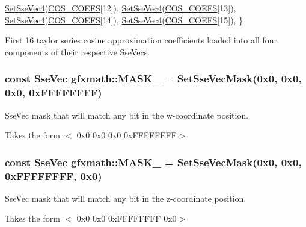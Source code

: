 \begin{DoxyCode}
        \hyperlink{namespacegfxmath_a8ceb1c8310eb6cbeec062c9a2d73322e}{SetSseVec4}(\hyperlink{group___scalar_math_consts_ga3cff608c650433d8c7a42212ba6296aa}{COS\_COEFS}[12]), 
        \hyperlink{namespacegfxmath_a8ceb1c8310eb6cbeec062c9a2d73322e}{SetSseVec4}(\hyperlink{group___scalar_math_consts_ga3cff608c650433d8c7a42212ba6296aa}{COS\_COEFS}[13]), 
        \hyperlink{namespacegfxmath_a8ceb1c8310eb6cbeec062c9a2d73322e}{SetSseVec4}(\hyperlink{group___scalar_math_consts_ga3cff608c650433d8c7a42212ba6296aa}{COS\_COEFS}[14]), 
        \hyperlink{namespacegfxmath_a8ceb1c8310eb6cbeec062c9a2d73322e}{SetSseVec4}(\hyperlink{group___scalar_math_consts_ga3cff608c650433d8c7a42212ba6296aa}{COS\_COEFS}[15]), 
    \}
\end{DoxyCode}


First 16 taylor series cosine approximation coefficients loaded into all four components of their respective Sse\+Vecs. 

\hypertarget{namespacegfxmath_a509609b50e3dc6f09c54ef9d02f48f2c}{}
\subsubsection[{M\+A\+S\+K\+\_\+0001}]{\setlength{\rightskip}{0pt plus 5cm}const {\bf Sse\+Vec} gfxmath\+::\+M\+A\+S\+K\+\_ = {\bf Set\+Sse\+Vec\+Mask}(0x0, 0x0, 0x0, 0x\+F\+F\+F\+F\+F\+F\+F\+F)}\label{namespacegfxmath_a509609b50e3dc6f09c54ef9d02f48f2c}


Sse\+Vec mask that will match any bit in the w-\/coordinate position. 

Takes the form $<$ 0x0 0x0 0x0 0x\+F\+F\+F\+F\+F\+F\+F\+F$>$ \hypertarget{namespacegfxmath_a8cb1abe895cbdf8c2bfd4aebad8d8593}{}
\subsubsection[{M\+A\+S\+K\+\_\+0010}]{\setlength{\rightskip}{0pt plus 5cm}const {\bf Sse\+Vec} gfxmath\+::\+M\+A\+S\+K\+\_ = {\bf Set\+Sse\+Vec\+Mask}(0x0, 0x0, 0x\+F\+F\+F\+F\+F\+F\+F\+F, 0x0)}\label{namespacegfxmath_a8cb1abe895cbdf8c2bfd4aebad8d8593}


Sse\+Vec mask that will match any bit in the z-\/coordinate position. 

Takes the form $<$ 0x0 0x0 0x\+F\+F\+F\+F\+F\+F\+F\+F 0x0$>$ \hypertarget{namespacegfxmath_ab0a1cad00f30a2a2967afd4076b70d14}{}
